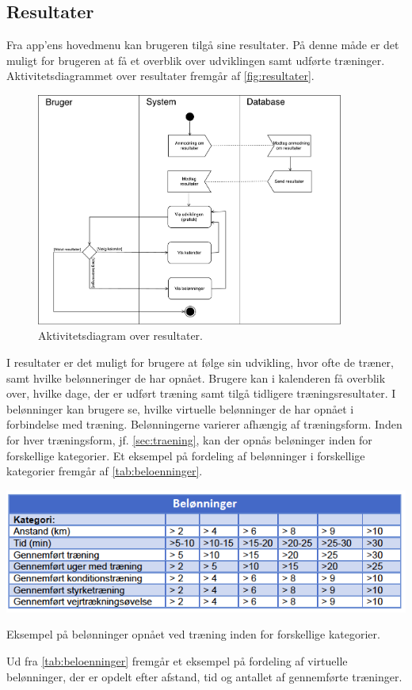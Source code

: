 \subsection*{Resultater}
Fra app'ens hovedmenu kan brugeren tilgå sine resultater. På denne måde er det muligt for brugeren at få et overblik over udviklingen samt udførte træninger.
Aktivitetsdiagrammet over resultater fremgår af \autoref{fig:resultater}.

\begin{figure} [H]
\centering
\includegraphics[width=0.9\textwidth]{figures/aktivitetsdiagram/Resultater}
\caption{Aktivitetsdiagram over resultater.}
\label{fig:resultater}
\end{figure}

\noindent
I resultater er det muligt for brugere at følge sin udvikling, hvor ofte de træner, samt hvilke belønneringer de har opnået. 
Brugere kan i kalenderen få overblik over, hvilke dage, der er udført træning samt tilgå tidligere træningsresultater. I belønninger kan brugere se, hvilke virtuelle belønninger de har opnået i forbindelse med træning. Belønningerne varierer afhængig af træningsform. Inden for hver træningsform, jf. \autoref{sec:traening}, kan der opnås beløninger inden for forskellige kategorier. Et eksempel på fordeling af belønninger i forskellige kategorier fremgår af \autoref{tab:beloenninger}.

\begin{table} [H]
\centering
\includegraphics[width=1\textwidth]{figures/aktivitetsdiagram/beloeninnger}
\caption{Eksempel på belønninger opnået ved træning inden for forskellige kategorier.}
\label{tab:beloenninger}
\end{table}

\noindent
Ud fra \autoref{tab:beloenninger} fremgår et eksempel på fordeling af virtuelle belønninger, der er opdelt efter afstand, tid og antallet af gennemførte træninger. 